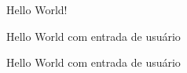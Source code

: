 \begin{frame}[fragile]{Hello World!}
\end{frame}

\begin{frame}[fragile]{Hello World com entrada de usuário}
\end{frame}

\begin{frame}[fragile]{Hello World com entrada de usuário}
\end{frame}

